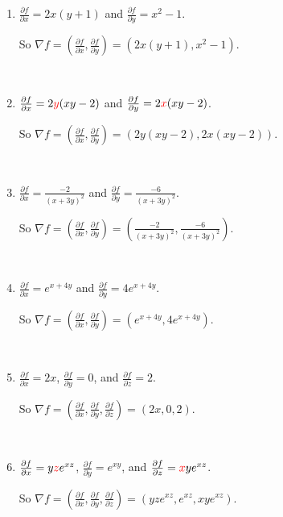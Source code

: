 \documentclass[11pt,fleqn]{book} %
\begin{document}
\begin{enumerate}
    \item 
    $\frac{\partial f}{\partial x} = 2x(y + 1)$ and 
    $\frac{\partial f}{\partial y} = x^2 - 1$. 
    
    So $\nabla f = \left( \frac{\partial f}{\partial x}, \frac{\partial f}{\partial y} \right) = (2x(y + 1), x^2 - 1)$. 

    {~~~}

    \item 
    $\frac{\partial f}{\partial x} = 2{\color{red}y}(xy - 2)$ and 
    $\frac{\partial f}{\partial y} = 2{\color{red}x}(xy - 2)$. 
    
    So $\nabla f = \left( \frac{\partial f}{\partial x}, \frac{\partial f}{\partial y} \right) = (2y(xy - 2), 2x(xy - 2))$. 

    {~~~}

    \item 
    $\frac{\partial f}{\partial x} = \frac{-2}{(x + 3y)^2}$ and 
    $\frac{\partial f}{\partial y} = \frac{-6}{(x + 3y)^2}$. 
    
    So $\nabla f = \left( \frac{\partial f}{\partial x}, \frac{\partial f}{\partial y} \right) = \left( \frac{-2}{(x + 3y)^2}, \frac{-6}{(x + 3y)^2} \right)$. 

    {~~~}

    \item 
    $\frac{\partial f}{\partial x} = e^{x + 4y}$ and 
    $\frac{\partial f}{\partial y} = 4e^{x + 4y}$. 
    
    So $\nabla f = \left( \frac{\partial f}{\partial x}, \frac{\partial f}{\partial y} \right) = (e^{x + 4y}, 4e^{x + 4y})$. 

    {~~~}

    \item 
    $\frac{\partial f}{\partial x} = 2x$, 
    $\frac{\partial f}{\partial y} = 0$, and
    $\frac{\partial f}{\partial z} = 2$. 
    
    So $\nabla f = \left( \frac{\partial f}{\partial x}, \frac{\partial f}{\partial y}, \frac{\partial f}{\partial z} \right) = (2x, 0, 2)$. 

    {~~~}

    \item 
    $\frac{\partial f}{\partial x} = y{\color{red}z}e^{xz}$, 
    $\frac{\partial f}{\partial y} = e^{xy}$, and
    $\frac{\partial f}{\partial z} = {\color{red}x}ye^{xz}$. 
    
    So $\nabla f = \left( \frac{\partial f}{\partial x}, \frac{\partial f}{\partial y}, \frac{\partial f}{\partial z} \right) = (yze^{xz}, e^{xz}, xye^{xz})$. 
\end{enumerate}
\end{document}
